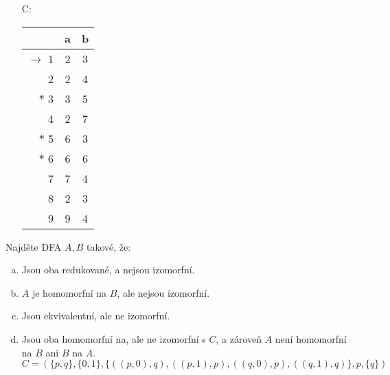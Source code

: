 \documentclass[a4paper,12pt]{amsart}
\begin{document}
\begin{problem}
\begin{multicols}{3}
\begin{itemize}
            \item[C:] \begin{tabular}{ r | c c }
            & a & b \\ \hline
            $\to$ 1 & 2 & 3 \\
            2 & 2 & 4 \\
            $\ast$ 3 & 3 & 5 \\
            4 & 2 & 7 \\
            $\ast$ 5 & 6 & 3 \\
            $\ast$ 6 & 6 & 6 \\
            7 & 7 & 4 \\
            8 & 2 & 3 \\
            9 & 9 & 4
            \end{tabular}
            
        \end{itemize} 

    \end{multicols}

\end{problem}


\vspace{-10pt}
\begin{problem}
    Najděte DFA $A,B$ takové, že:    
    \begin{enumerate}[(a)]
        \item Jsou oba redukované, a nejsou izomorfní. 
        \item $A$ je homomorfní na $B$, ale nejsou izomorfní.
        \item Jsou ekvivalentní, ale ne izomorfní.
        \item Jsou oba homomorfní na, ale ne izomorfní s $C$, a zároveň $A$ není homomorfní na $B$ ani $B$ na $A$.
        $$
        C=(\{p,q\},\{0,1\},\{((p,0),q),((p,1),p),((q,0),p),((q,1),q)\},p,\{q\})
        $$
    \end{enumerate}

\end{problem}
\end{document}
